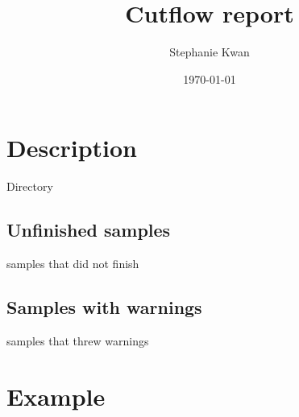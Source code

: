 \documentclass[11pt]{article}
\title{Cutflow report}
\author{ Stephanie Kwan }
\date{\today}
\begin{document}
\maketitle


\section{Description}
Directory

\subsection{Unfinished samples}
samples that did not finish 

\subsection{Samples with warnings}
samples that threw warnings

\section{Example}



\end{document}
